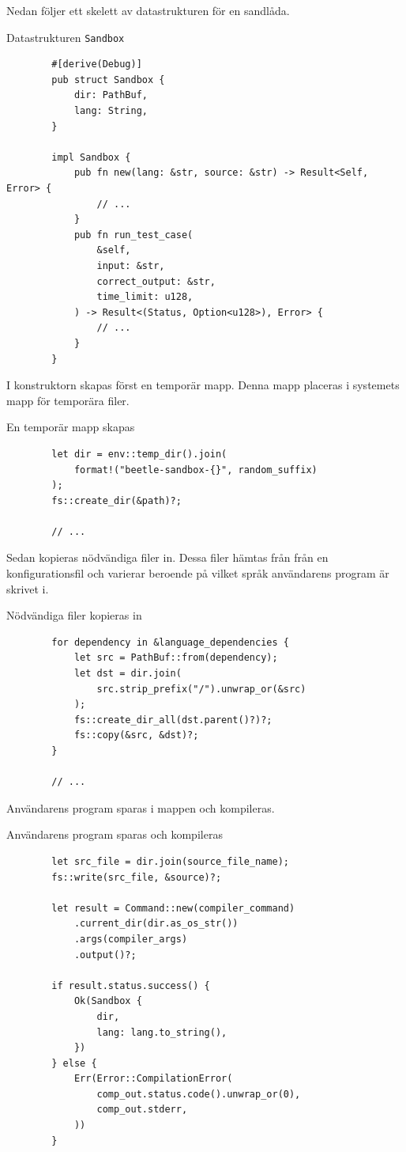 \documentclass{article}
\begin{document}
Nedan följer ett skelett av datastrukturen för en sandlåda.

\begin{listing}[H]
	\caption{Datastrukturen \texttt{Sandbox}}
	\begin{verbatim}
		#[derive(Debug)]
		pub struct Sandbox {
			dir: PathBuf,
			lang: String,
		}

		impl Sandbox {
			pub fn new(lang: &str, source: &str) -> Result<Self, Error> {
				// ...
			}
			pub fn run_test_case(
				&self,
				input: &str,
				correct_output: &str,
				time_limit: u128,
			) -> Result<(Status, Option<u128>), Error> {
				// ...
			}
		}
	\end{verbatim}
\end{listing}

I konstruktorn skapas först en temporär mapp. Denna mapp placeras i systemets
mapp för temporära filer.

\begin{listing}[H]
	\caption{En temporär mapp skapas}
	\begin{verbatim}
		let dir = env::temp_dir().join(
			format!("beetle-sandbox-{}", random_suffix)
		);
		fs::create_dir(&path)?;

		// ...
	\end{verbatim}
\end{listing}

Sedan kopieras nödvändiga filer in. Dessa filer hämtas från från en
konfigurationsfil och varierar beroende på vilket språk användarens program är
skrivet i.

\begin{listing}[H]
	\caption{Nödvändiga filer kopieras in}
	\begin{verbatim}
		for dependency in &language_dependencies {
			let src = PathBuf::from(dependency);
			let dst = dir.join(
				src.strip_prefix("/").unwrap_or(&src)
			);
			fs::create_dir_all(dst.parent()?)?;
			fs::copy(&src, &dst)?;
		}

		// ...
	\end{verbatim}
\end{listing}

Användarens program sparas i mappen och kompileras.

\begin{listing}[H]
	\caption{Användarens program sparas och kompileras}
	\begin{verbatim}
		let src_file = dir.join(source_file_name);
		fs::write(src_file, &source)?;

		let result = Command::new(compiler_command)
			.current_dir(dir.as_os_str())
			.args(compiler_args)
			.output()?;

		if result.status.success() {
			Ok(Sandbox {
				dir,
				lang: lang.to_string(),
			})
		} else {
			Err(Error::CompilationError(
				comp_out.status.code().unwrap_or(0),
				comp_out.stderr,
			))
		}
	\end{verbatim}
\end{listing}
\end{document}
